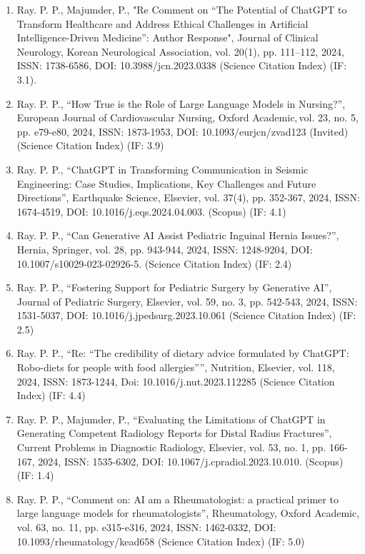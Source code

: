 \documentclass[11pt,a4paper]{moderncv}
\begin{document}
\begin{adjustwidth}{6em}{0pt}
\begin{enumerate}
		\item Ray. P. P., Majumder, P., "Re Comment on “The Potential of ChatGPT to Transform Healthcare and Address Ethical Challenges in Artificial Intelligence-Driven Medicine”: Author Response", Journal of Clinical Neurology, Korean Neurological Association, vol. 20(1), pp. 111–112, 2024, ISSN: 1738-6586, DOI: 10.3988/jcn.2023.0338 (Science Citation Index) (IF: 3.1). 
		
		\item Ray. P. P., “How True is the Role of Large Language Models in Nursing?”, European Journal of Cardiovascular Nursing, Oxford Academic, vol. 23, no. 5, pp. e79-e80, 2024, ISSN: 1873-1953, DOI: 10.1093/eurjcn/zvad123 (Invited) (Science Citation Index) (IF: 3.9)
		
		\item Ray. P. P., “ChatGPT in Transforming Communication in Seismic Engineering: Case Studies, Implications, Key Challenges and Future Directions”, Earthquake Science, Elsevier, vol. 37(4), pp. 352-367, 2024, ISSN: 1674-4519, DOI: 10.1016/j.eqs.2024.04.003. (Scopus) (IF: 4.1)
		
		\item Ray. P. P., “Can Generative AI Assist Pediatric Inguinal Hernia Issues?”, Hernia, Springer, vol. 28, pp. 943-944, 2024, ISSN: 1248-9204, DOI: 10.1007/s10029-023-02926-5. (Science Citation Index) (IF: 2.4)
		
		\item Ray. P. P., “Fostering Support for Pediatric Surgery by Generative AI”, Journal of Pediatric Surgery, Elsevier, vol. 59, no. 3, pp. 542-543, 2024, ISSN: 1531-5037, DOI: 10.1016/j.jpedsurg.2023.10.061 (Science Citation Index) (IF: 2.5)
		
		\item Ray. P. P., “Re: “The credibility of dietary advice formulated by ChatGPT: Robo-diets for people with food allergies””, Nutrition, Elsevier, vol. 118, 2024, ISSN: 1873-1244, Doi: 10.1016/j.nut.2023.112285 (Science Citation Index) (IF: 4.4)
		
		\item Ray. P. P., Majumder, P., “Evaluating the Limitations of ChatGPT in Generating Competent Radiology Reports for Distal Radius Fractures”, Current Problems in Diagnostic Radiology, Elsevier, vol. 53, no. 1, pp. 166-167, 2024, ISSN: 1535-6302, DOI: 10.1067/j.cpradiol.2023.10.010. (Scopus) (IF: 1.4)
		
		\item Ray. P. P., “Comment on: AI am a Rheumatologist: a practical primer to large language models for rheumatologists”, Rheumatology, Oxford Academic, vol. 63, no. 11, pp. e315-e316, 2024, ISSN: 1462-0332, DOI: 10.1093/rheumatology/kead658 (Science Citation Index) (IF: 5.0)
		

\end{enumerate}
\end{adjustwidth}
\end{document}
